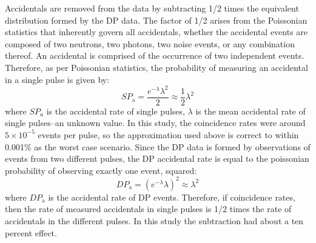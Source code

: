 Accidentals are removed from the data by subtracting 1/2 times the equivalent distribution formed by the DP data.
The factor of 1/2 arises from the Poissonian statistics that inherently govern all accidentals, whether the accidental events are composed of two neutrons, two photons, two noise events, or any combination thereof.
An accidental is comprised of the occurrence of two independent events.
Therefore, as per Poissonian statistics, the probability of measuring an accidental in a single pulse is given by:
\begin{displaymath}
SP_{\text{a}} = \frac{e^{-\lambda}\lambda^2}{2} \approx \frac{1}{2}\lambda^{2}
\end{displaymath}
where $SP_{a}$ is the accidental rate of single pulses, $\lambda$ is the mean accidental rate of single pulses–an unknown value.
In this study, the coincidence rates were around $5\times10^{-5}$ events per pulse, so the approximation used above is correct to within 0.001\% as the worst case scenario.
Since the DP data is formed by observations of events from two different pulses, the DP accidental rate is equal to the poissonian probability of observing exactly one event, squared:
\begin{displaymath}
DP_{\text{a}} = (e^{-\lambda}\lambda)^{2}\approx \lambda^{2} 
\end{displaymath}
where $DP_{\text{a}}$ is the accidental rate of DP events.
Therefore, if coincidence rates, then the rate of measured accidentals in single pulses is 1/2 times the rate of accidentals in the different pulses.
In this study the subtraction had about a ten percent effect.
